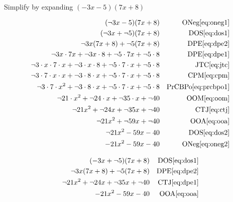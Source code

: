 \begin{example}[id:20141109-141019] \label{20141109-141019}  \hfill \\

Simplify by expanding $(-3x-5)(7x+8)$

\soln

\solnsteps
\begin{align*}
(\neg 3x - 5)(7x+8)  && \text{ONeg} \eqref{eq:oneg1} \\
(\neg 3x + \neg 5)(7x+8)  && \text{DOS} \eqref{eq:dos1} \\
\neg 3x(7x+8) + \neg 5(7x+8) && \text{DPE} \eqref{eq:dpe2} \\
\neg 3x \cdot 7x + \neg 3x \cdot 8 + \neg 5 \cdot 7x + \neg 5 \cdot 8 && \text{DPE} \eqref{eq:dpe1} \\
\neg 3 \cdot x \cdot 7 \cdot x + \neg 3 \cdot x \cdot 8 + \neg 5 \cdot 7 \cdot x + \neg 5 \cdot 8 && \text{JTC} \eqref{eq:jtc} \\
\neg 3 \cdot 7 \cdot x \cdot x + \neg 3 \cdot 8 \cdot x + \neg 5 \cdot 7 \cdot x + \neg 5 \cdot 8  && \text{CPM} \eqref{eq:cpm} \\
\neg 3 \cdot 7 \cdot x^2 + \neg 3 \cdot 8 \cdot x + \neg 5 \cdot 7 \cdot x + \neg 5 \cdot 8  && \text{PrCBPo} \eqref{eq:prcbpo1} \\
\neg 21 \cdot x^2 + \neg 24 \cdot x + \neg 35 \cdot x + \neg 40  && \text{OOM} \eqref{eq:oom} \\
\neg 21  x^2 + \neg 24  x + \neg 35  x + \neg 40  && \text{CTJ} \eqref{eq:ctj} \\
\neg 21 x^2 + \neg 59 x + \neg 40  && \text{OOA} \eqref{eq:ooa} \\
\neg 21 x^2 - 59 x - 40  && \text{DOS} \eqref{eq:dos2} \\
- 21 x^2 - 59 x - 40  && \text{ONeg} \eqref{eq:oneg2} 
\end{align*}

\soln

\lesssteps
\begin{align*}
(-3x+\neg 5)(7x+8) && \text{DOS} \eqref{eq:dos1} \\
\neg 3x(7x+8) + \neg 5(7x+8) && \text{DPE} \eqref{eq:dpe2} \\
\neg 21  x^2 + \neg 24  x + \neg 35  x + \neg 40  && \text{CTJ} \eqref{eq:dpe1} \\
-21x^2-59x-40 && \text{OOA} \eqref{eq:ooa} 
\end{align*}
\end{example}

